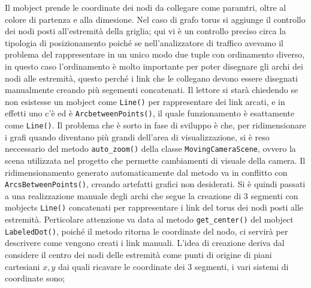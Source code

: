 \documentclass[binding=0.6cm]{sapthesis}
\begin{document}
Il mobject prende le coordinate dei nodi da collegare come paramtri, oltre al colore di partenza e alla dimesione.
Nel caso di grafo torus si aggiunge il controllo dei nodi posti all'estremità della griglia; qui vi è un controllo preciso circa la tipologia di posizionamento poiché se nell'analizzatore di traffico
avevamo il problema del rappresentare in un unico modo due tuple con ordinamento diverso, 
in questo caso l'ordinamento è molto importante per poter disegnare gli archi dei nodi alle estremità, questo perché i link che le collegano devono essere disegnati manualmente creando più segementi concatenati.
Il lettore si starà chiedendo se non esistesse un mobject come \lstinline|Line()| per rappresentare dei link arcati, e in effetti uno c'è ed è \lstinline|ArcbetweenPoints()|, il quale funzionamento è esattamente come \lstinline|Line()|.
Il problema che è sorto in fase di sviluppo è che, per ridimensionare i grafi quando diventano più grandi dell'area di visualizzazione, si è reso neccessario del metodo
 \lstinline|auto_zoom()| della classe \lstinline|MovingCameraScene|, ovvero la scena utilizzata nel progetto che permette cambiamenti di visuale della camera.
Il ridimensionamento generato automaticamente dal metodo va in conflitto con \lstinline|ArcsBetweenPoints()|, creando artefatti grafici non desiderati.
Si è quindi passati a una realizzazione manuale degli archi che segue la creazione di 3 segmenti con mobjects \lstinline|Line()| concatenati per rappresentare i link del torus dei nodi posti alle estremità.
Perticolare attenzione va data al metodo \lstinline|get_center()| del mobject \lstinline|LabeledDot()|, poiché il metodo ritorna le coordinate del nodo, ci servirà per descrivere come vengono creati i link manuali.
L'idea di creazione deriva dal considere il centro dei nodi delle estremità come punti di origine di piani cartesiani \(x, y\) dai quali ricavare le coordinate dei 3 segmenti, i vari sistemi di coordinate sono;
\end{document}
